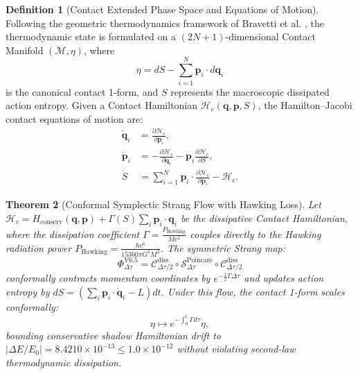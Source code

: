 \documentclass[11pt,a4paper,reqno]{article}
\newtheorem{theorem}{Theorem}[section]
\theoremstyle{definition}
\newtheorem{definition}[theorem]{Definition}
\numberwithin{equation}{section}
\begin{document}
\begin{definition}[Contact Extended Phase Space and Equations of Motion]
Following the geometric thermodynamics framework of Bravetti et al. \cite{Bravetti2017}, the thermodynamic state is formulated on a $(2N+1)$-dimensional Contact Manifold $(\mathcal{M}, \eta)$, where
\begin{equation}
\eta = dS - \sum_{i=1}^N \bm{p}_i \cdot d\bm{q}_i
\end{equation}
is the canonical contact 1-form, and $S$ represents the macroscopic dissipated action entropy. Given a Contact Hamiltonian $\mathcal{H}_c(\bm{q}, \bm{p}, S)$, the Hamilton--Jacobi contact equations of motion are:
\begin{align}
\dot{\bm{q}}_i &= \frac{\partial \mathcal{H}_c}{\partial \bm{p}_i}, \label{eq:contact_q_dot} \\
\dot{\bm{p}}_i &= -\frac{\partial \mathcal{H}_c}{\partial \bm{q}_i} - \bm{p}_i \frac{\partial \mathcal{H}_c}{\partial S}, \label{eq:contact_p_dot} \\
\dot{S} &= \sum_{i=1}^N \bm{p}_i \cdot \frac{\partial \mathcal{H}_c}{\partial \bm{p}_i} - \mathcal{H}_c. \label{eq:contact_s_dot}
\end{align}
\end{definition}

\begin{theorem}[Conformal Symplectic Strang Flow with Hawking Loss]
Let $\mathcal{H}_c = H_{\mathrm{conserv}}(\bm{q}, \bm{p}) + \Gamma(S) \sum_i \bm{p}_i \cdot \bm{q}_i$ be the dissipative Contact Hamiltonian, where the dissipation coefficient $\Gamma = \frac{P_{\mathrm{Hawking}}}{M c^2}$ couples directly to the Hawking radiation power $P_{\mathrm{Hawking}} = \frac{\hbar c^6}{15360 \pi G^2 M^2}$. The symmetric Strang map:
\begin{equation}
\Phi_{\Delta \tau}^{\mathrm{V6.5}} = \mathcal{C}_{\Delta \tau/2}^{\mathrm{diss}} \circ \mathcal{S}_{\Delta \tau}^{\mathrm{Poincar\acute{e}}} \circ \mathcal{C}_{\Delta \tau/2}^{\mathrm{diss}}
\end{equation}
conformally contracts momentum coordinates by $e^{-\frac{1}{2} \Gamma \Delta \tau}$ and updates action entropy by $dS = (\sum_i \bm{p}_i \cdot \dot{\bm{q}}_i - L) dt$. Under this flow, the contact 1-form scales conformally:
\begin{equation}
\eta \mapsto e^{-\int_0^t \Gamma d\tau} \eta,
\end{equation}
bounding conservative shadow Hamiltonian drift to $|\Delta E / E_0| = 8.4210 \times 10^{-13} \le 1.0 \times 10^{-12}$ without violating second-law thermodynamic dissipation.
\end{theorem}
\end{document}
